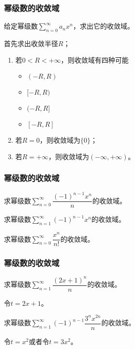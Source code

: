 \documentclass[14pt,notheorems,leqno,xcolor={rgb}]{beamer} %
\begin{document}
\begin{frame}
\frametitle{幂级数的收敛域}
\begin{problem*}
给定幂级数$\sum\limits_{n=0}^{\infty}a_nx^n$，求出它的收敛域。
\end{problem*}
\begin{solution}
首先求出收敛半径$R$；
\begin{enumerate}[<+->]
  \item 若$0<R<+\infty$，则收敛域有四种可能
  \begin{multicols}{2}\begin{itemize}
    \item $(-R,R)$
    \item $[-R,R)$
    \item $(-R,R]$
    \item $[-R,R]$
  \end{itemize}\end{multicols}
  \item 若$R=0$，则收敛域为$\{0\}$；
  \item 若$R=+\infty$，则收敛域为$(-\infty,+\infty)$。
\end{enumerate}
\end{solution}
\end{frame}

\begin{frame}
\frametitle{幂级数的收敛域}
\begin{example}
求幂级数$\sum\limits_{n=0}^{\infty}\dfrac{(-1)^{n-1}x^n}n$的收敛域。
\end{example}
\vpause
\begin{example}
求幂级数$\sum\limits_{n=1}^{\infty}(-1)^{n-1}x^n$的收敛域。
\end{example}
\vpause
\begin{example}
求幂级数$\sum\limits_{n=0}^{\infty}\dfrac{x^n}{n!}$的收敛域。
\end{example}
\end{frame}

\begin{frame}
\frametitle{幂级数的收敛域}
\begin{example}
求幂级数$\sum\limits_{n=1}^{\infty}\dfrac{(2x+1)^n}n$的收敛域。
\end{example}
\pause
\begin{solution}
令$t=2x+1$。
\end{solution}
\vpause
\begin{example}
求幂级数$\sum\limits_{n=1}^{\infty}(-1)^{n-1}\dfrac{3^nx^{2n}}{n}$的收敛域。
\end{example}
\pause
\begin{solution}
令$t=x^2$或者令$t=3x^2$。
\end{solution}
\end{frame}
\end{document}
